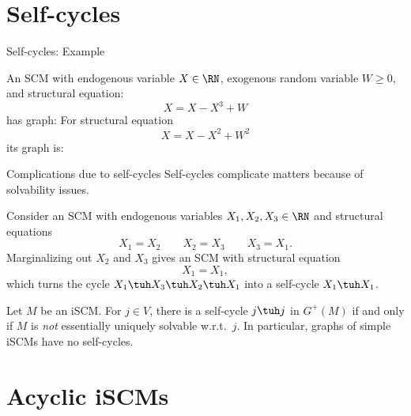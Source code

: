 \part{Self-cycles}
\frame{\partpage}

\begin{frame}{Self-cycles: Example}
\begin{Eg}
  An SCM with endogenous variable $X \in \RN$, exogenous random variable $W \ge 0$, and structural equation:
  $$X = X -X^3 + W$$
  has graph:
  For structural equation 
  $$X = X - X^2 + W^2$$
  its graph is:\\
\end{Eg}
\end{frame}

\begin{frame}{Complications due to self-cycles}
Self-cycles complicate matters because of solvability issues.
\begin{Eg}
Consider an SCM with endogenous variables $X_1,X_2,X_3 \in \RN$ and structural equations
$$X_1 = X_2 \qquad
  X_2 = X_3 \qquad
  X_3 = X_1.$$
Marginalizing out $X_2$ and $X_3$ gives an SCM with structural equation
$$X_1 = X_1,$$
which turns the cycle $X_1\tuh X_3 \tuh X_2\tuh X_1$ into a self-cycle $X_1\tuh X_1$.
\end{Eg}

\bigskip
  \begin{Prp}[\ref{prp:self-cycles}]
  Let $M$ be an iSCM.
  For $j \in V$, there is a self-cycle $j \tuh j$ in $G^+(M)$ if and only if
  $M$ is \emph{not} essentially uniquely solvable w.r.t.\ $j$. 
  In particular, graphs of simple iSCMs have no self-cycles.
\end{Prp}
\end{frame}

\part{Acyclic iSCMs}
\frame{\partpage}

